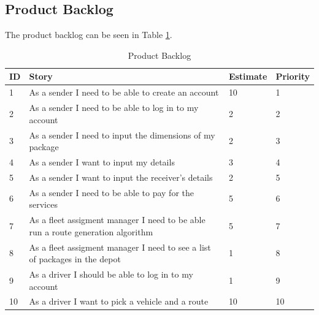 \documentclass[paper=a4, fontsize=11pt]{scrartcl} %
\numberwithin{equation}{section} %
\numberwithin{figure}{section} %
\numberwithin{table}{section} %
\begin{document}
\subsection{Product Backlog}
The product backlog can be seen in Table \ref{ProductBacklogTable}.
\begin{table}[!hbt]
\centering
\caption{Product Backlog}
\label{ProductBacklogTable}
\begin{tabular}{|p{1cm}|p{8cm}|p{2cm}|p{1.2cm}|}
\hline
\textbf{ID} & \textbf{Story}                                                                                         & \textbf{Estimate} & \textbf{Priority} \\ \hline
1           & As a sender I need to be able to create an account                                                     & 10                & 1                 \\ \hline
2           & As a sender I need to be able to log in to my account                                                  & 2                 & 2                 \\ \hline
3           & As a sender I need to input the dimensions of my package                                               & 2                 & 3                 \\ \hline
4           & As a sender I want to input my details                                                                 & 3                 & 4                 \\ \hline
5           & As a sender I want to input the receiver's details                                                     & 2                 & 5                 \\ \hline
6           & As a sender I need to be able to pay for the services                                                  & 5                 & 6                 \\ \hline
7           & As a fleet assigment manager I need to be able run a route generation algorithm                        & 5                 & 7                 \\ \hline
8           & As a fleet assigment manager I need to see a list of packages in the depot                             & 1                 & 8                 \\ \hline
9           & As a driver I should be able to log in to my account                                                   & 1                 & 9                 \\ \hline
10          & As a driver I want to pick a vehicle and a route                                                       & 10                & 10                \\ \hline

\end{tabular}
\end{table}
\end{document}
